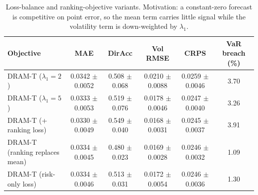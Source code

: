 \begin{table}
\caption{Loss-balance and ranking-objective variants. Motivation: a constant-zero forecast is competitive on point error, so the mean term carries little signal while the volatility term is down-weighted by $\lambda_1$.}
\label{tab:objective}
\begin{tabular}{lccccc}
\toprule
Objective & MAE & DirAcc & Vol RMSE & CRPS & VaR breach (\%) \\
\midrule
DRAM-T ($\lambda_1=2$) & 0.0342 $\pm$ 0.0052 & 0.508 $\pm$ 0.068 & 0.0210 $\pm$ 0.0088 & 0.0259 $\pm$ 0.0046 & 3.70 \\
DRAM-T ($\lambda_1=5$) & 0.0333 $\pm$ 0.0053 & 0.519 $\pm$ 0.076 & 0.0178 $\pm$ 0.0046 & 0.0247 $\pm$ 0.0040 & 3.26 \\
DRAM-T (+ ranking loss) & 0.0330 $\pm$ 0.0049 & 0.549 $\pm$ 0.040 & 0.0168 $\pm$ 0.0031 & 0.0245 $\pm$ 0.0037 & 3.91 \\
DRAM-T (ranking replaces mean) & 0.0334 $\pm$ 0.0045 & 0.480 $\pm$ 0.023 & 0.0169 $\pm$ 0.0028 & 0.0246 $\pm$ 0.0032 & 1.09 \\
DRAM-T (risk-only loss) & 0.0334 $\pm$ 0.0046 & 0.513 $\pm$ 0.031 & 0.0172 $\pm$ 0.0054 & 0.0246 $\pm$ 0.0036 & 1.30 \\
\bottomrule
\end{tabular}
\end{table}
